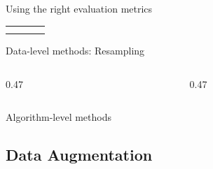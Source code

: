 \begin{frame}{Using the right evaluation metrics}
  \footnotesize
  \renewcommand{\arraystretch}{1.25}
  \begin{tabular}{@{}llll@{}}
    \toprule
     & & & \\
    \midrule
     & & & \\
     & & & \\
    \bottomrule
  \end{tabular}
\end{frame}

\begin{frame}{Data-level methods: Resampling}
  \begin{columns}[T,onlytextwidth]
    \begin{column}{0.47\textwidth}
      \begin{tdblock}[equal height group=rsmp]
      \end{tdblock}
    \end{column}
    \begin{column}{0.47\textwidth}
      \begin{tdblock}[equal height group=rsmp]
      \end{tdblock}
    \end{column}
  \end{columns}
\end{frame}

\begin{frame}{Algorithm-level methods}
  \begin{withmargin}
    \begin{tdmain}
    \end{tdmain}
    \begin{tdmargin}
    \end{tdmargin}
  \end{withmargin}
\end{frame}
\fi

\subsection{Data Augmentation}

\begin{frame}[plain]
\end{frame}

